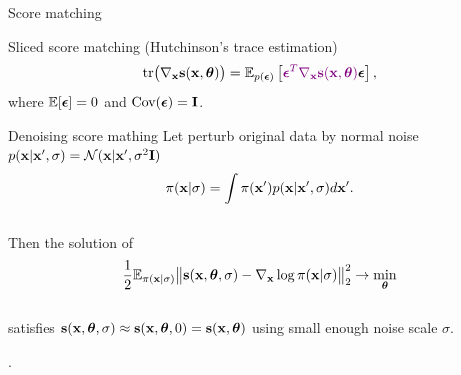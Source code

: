 \begin{frame}{Score matching}
	\vspace{-0.3cm}
	\begin{block}{Sliced score matching (Hutchinson's trace estimation)}
		\vspace{-0.3cm}
		\[
			\text{tr}\bigl(\nabla_{\mathbf{x}} \mathbf{s}(\mathbf{x}, \boldsymbol{\theta})\bigr) = \mathbb{E}_{p(\boldsymbol{\epsilon})} \left[ {\color{violet}\boldsymbol{\epsilon}^T \nabla_{\mathbf{x}} \mathbf{s}(\mathbf{x}, \boldsymbol{\theta})} \boldsymbol{\epsilon} \right],
		\]
		where $\mathbb{E} [\boldsymbol{\epsilon}] = 0$ and $\text{Cov} (\boldsymbol{\epsilon}) = \mathbf{I}$.
	\end{block}
	\vspace{-0.2cm}
	\begin{block}{Denoising score mathing}
		Let perturb original data by normal noise $p(\mathbf{x} | \mathbf{x}', \sigma) = \mathcal{N}(\mathbf{x} | \mathbf{x}', \sigma^2 \mathbf{I})$
		\vspace{-0.3cm}
		\[
			\pi(\mathbf{x} | \sigma) = \int \pi(\mathbf{x}') p(\mathbf{x} | \mathbf{x}', \sigma) d\mathbf{x}'.
		\]
		\vspace{-0.6cm} \\
		Then the solution of 
		\vspace{-0.2cm}
		\[
			\frac{1}{2} \mathbb{E}_{\pi(\mathbf{x} | \sigma)}\bigl\| \mathbf{s}(\mathbf{x}, \boldsymbol{\theta}, \sigma) - \nabla_{\mathbf{x}} \log \pi(\mathbf{x} | \sigma) \bigr\|^2_2 \rightarrow \min_{\boldsymbol{\theta}}
		\]
		\vspace{-0.5cm} \\
		satisfies $\mathbf{s}(\mathbf{x}, \boldsymbol{\theta}, \sigma) \approx \mathbf{s}(\mathbf{x}, \boldsymbol{\theta}, 0) = \mathbf{s}(\mathbf{x}, \boldsymbol{\theta})$ using small enough noise scale $\sigma$.
	\end{block}
	.
\end{frame}
